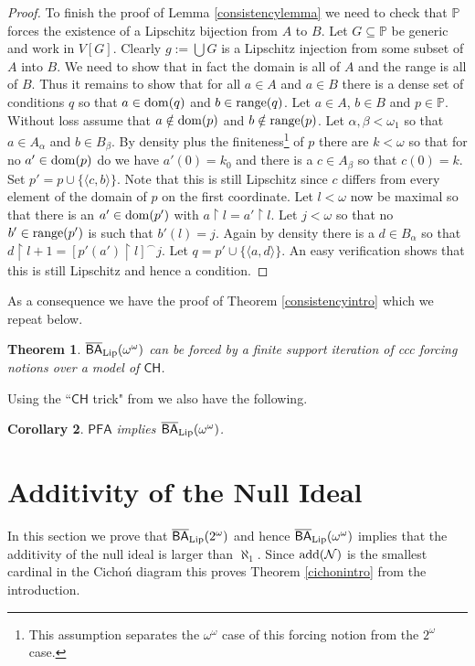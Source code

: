 \documentclass[leqno,11pt]{amsart}
\newtheorem{theorem}{Theorem}[section]
\newtheorem{corollary}[theorem]{Corollary}
\theoremstyle{definition}
\theoremstyle{remark}
\def\hook{\upharpoonright}
\def\Null{\mathcal N}
\def\PFA{\mathsf{PFA}}
\def\BA{\mathsf{BA}}
\def\baire{\omega^\omega}
\def\cantor{2^\omega}
\def\CH {\mathsf{CH}}
\def\P{\mathbb P}
\def\add{{\rm add}}
\begin{document}
\begin{proof}
To finish the proof of Lemma \ref{consistencylemma} we need to check that $\P$ forces the existence of a Lipschitz bijection from $A$ to $B$. Let $G \subseteq \P$ be generic and work in $V[G]$. Clearly $g:= \bigcup G$ is a Lipschitz injection from some subset of $A$ into $B$. We need to show that in fact the domain is all of $A$ and the range is all of $B$. Thus it remains to show that for all $a \in A$ and $a \in B$ there is a dense set of conditions $q$ so that $a \in {\rm dom}(q)$ and $b \in {\rm range}(q)$. Let $a \in A$, $b \in B$ and $p \in \P$. Without loss assume that $a \notin {\rm dom} (p)$ and $b \notin {\rm range}(p)$. Let $\alpha, \beta < \omega_1$ so that $a \in A_\alpha$ and $b \in B_\beta$. By density plus the finiteness\footnote{This assumption separates the $\baire$ case of this forcing notion from the $2^\omega$ case.} of $p$ there are $k < \omega$ so that for no $a' \in {\rm dom}(p)$ do we have $a' (0) = k_0$ and there is a $c \in A_\beta$ so that $c(0) = k$. Set $p' = p \cup \{\langle c, b\rangle\}$. Note that this is still Lipschitz since $c$ differs from every element of the domain of $p$ on the first coordinate. Let $l < \omega$ now be maximal so that there is an $a' \in {\rm dom}(p ')$ with $a \hook l = a' \hook l$. Let $j < \omega$ so that no $b' \in {\rm range}(p')$ is such that $b' (l) = j$. Again by density there is a $d \in B_\alpha$ so that $d \hook l+1 = [p'(a') \hook l]^\frown j$. Let $q = p' \cup \{\langle a, d\rangle\}$. An easy verification shows that this is still Lipschitz and hence a condition. 
    \end{proof}

As a consequence we have the proof of Theorem \ref{consistencyintro} which we repeat below.
    \begin{theorem}\label{consistency}
   $\overline{\BA}_{\rm Lip} (\baire)$ can be forced by a finite support iteration of ccc forcing notions over a model of $\CH$.    
    \end{theorem}


    Using the ``$\CH$ trick" from \cite{BaumPFA} we also have the following.

    \begin{corollary}
        $\PFA$ implies $\overline{\BA}_{\rm Lip} (\baire)$. 
    \end{corollary}
    
    \section{Additivity of the Null Ideal}
In this section we prove that $\overline{\BA}_{\rm Lip}(\cantor)$ and hence $\overline{\BA}_{\rm Lip} (\baire)$ implies that the additivity of the null ideal is larger than $\aleph_1$. Since $\add(\Null)$ is the smallest cardinal in the Cicho\'{n} diagram this proves Theorem \ref{cichonintro} from the introduction. 
\end{document}
